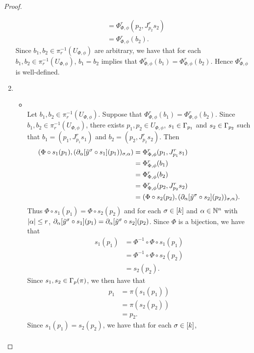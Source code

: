 \documentclass{book}
\begin{document}
\begin{proof}
\begin{enumerate}
\begin{align*}
			& = \Phi^r_{\Phi, \phi}(p_2, J^r_{p_2}s_2) \\
			& = \Phi^r_{\Phi, \phi}(b_2).
		\end{align*}
		Since $b_1, b_2 \in \pi_r^{-1}(U_{\Phi, \phi})$ are arbitrary, we have that for each $b_1, b_2 \in \pi_r^{-1}(U_{\Phi, \phi})$, $b_1 = b_2$ implies that $\Phi^r_{\Phi, \phi}(b_1) = \Phi^r_{\Phi, \phi}(b_2)$. Hence $\Phi^r_{\Phi, \phi}$ is well-defined.
		\item 
		\begin{itemize}
			\item {} \\
			Let $b_1, b_2 \in \pi_r^{-1}(U_{\Phi, \phi})$. Suppose that $\Phi^r_{\Phi, \phi}(b_1) = \Phi^r_{\Phi, \phi}(b_2)$. Since $b_1, b_2 \in \pi_r^{-1}(U_{\Phi, \phi})$, there exists $p_1, p_2 \in U_{\Phi, \phi}$, $s_1 \in \Gamma_{p_1}$ and $s_2 \in \Gamma_{p_2}$ such that $b_1 = (p_1, J^r_{p_1} s_1)$ and $b_2 = (p_2, J^r_{p_2} s_2)$. Then 
			\begin{align*}
				(\Phi \circ s_1(p_1), (\partial_{\alpha}[\tilde{y}^{\sigma} \circ s_1](p_1))_{\sigma, \alpha})
				& = \Phi^r_{\Phi, \phi}(p_1, J^r_{p_1}s_1) \\
				& = \Phi^r_{\Phi, \phi}(b_1) \\
				& = \Phi^r_{\Phi, \phi}(b_2) \\
				& = \Phi^r_{\Phi, \phi}(p_2, J^r_{p_2}s_2) \\
				& = (\Phi \circ s_2(p_2), (\partial_{\alpha}[\tilde{y}^{\sigma} \circ s_2](p_2))_{\sigma, \alpha}).
			\end{align*}
			Thus $\Phi \circ s_1(p_1) = \Phi \circ s_2(p_2)$ and for each $\sigma \in [k]$ and $\alpha \in \mathbb{N}^n$ with $|\alpha| \leq r$, $\partial_{\alpha} [\tilde{y}^{\sigma} \circ s_1](p_1) = \partial_{\alpha} [\tilde{y}^{\sigma} \circ s_2](p_2)$. Since $\Phi$ is a bijection, we have that
			\begin{align*}
				s_1(p_1)
				& = \Phi^{-1} \circ \Phi \circ s_1(p_1) \\
				& = \Phi^{-1} \circ \Phi \circ s_2(p_2) \\
				& = s_2(p_2).
			\end{align*} 
			Since $s_1, s_2 \in \Gamma_p(\pi)$, we then have that
			\begin{align*}
				p_1
				& = \pi(s_1(p_1))\\
				& = \pi(s_2(p_2)) \\
				& = p_2.
			\end{align*}
			Since $s_1(p_1) = s_2(p_2)$, we have that for each $\sigma \in [k]$, 
			\begin{align*}

\end{align*}
\end{itemize}
\end{enumerate}
\end{proof}
\end{document}
